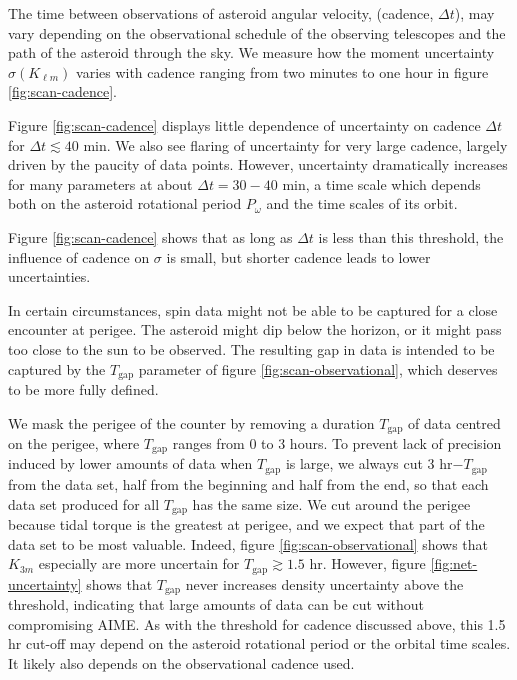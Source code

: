 \documentclass[fleqn,usenatbib]{mnras}
\begin{document}
The time between observations of asteroid angular velocity, (cadence, $\Delta t$), may vary depending on the observational schedule of the observing telescopes and the path of the asteroid through the sky.  We measure how the moment uncertainty $\sigma(K_{\ell m})$ varies with cadence ranging from two minutes to one hour in figure \ref{fig:scan-cadence}.

Figure \ref{fig:scan-cadence} displays little dependence of uncertainty on cadence $\Delta t$ for $\Delta t \lesssim 40$ min. We also see flaring of uncertainty for very large cadence, largely driven by the paucity of data points. However, uncertainty dramatically increases for many parameters at about $\Delta t = 30-40$ min, a time scale which depends both on the asteroid rotational period $P_\omega$ and the time scales of its orbit.

Figure \ref{fig:scan-cadence} shows that as long as $\Delta t$ is less than this threshold, the influence of cadence on $\sigma$ is small, but shorter cadence leads to lower uncertainties.

In certain circumstances, spin data might not be able to be captured for a close encounter at perigee. The asteroid might dip below the horizon, or it might pass too close to the sun to be observed. The resulting gap in data is intended to be captured by the $T_\text{gap}$ parameter of figure \ref{fig:scan-observational}, which deserves to be more fully defined.

We mask the perigee of the counter by removing a duration $T_\text{gap}$ of data centred on the perigee, where $T_\text{gap}$ ranges from 0 to 3 hours. To prevent lack of precision induced by lower amounts of data when $T_\text{gap}$ is large, we always cut 3 hr$-T_\text{gap}$ from the data set, half from the beginning and half from the end, so that each data set produced for all $T_\text{gap}$ has the same size. We cut around the perigee because tidal torque is the greatest at perigee, and we expect that part of the data set to be most valuable. Indeed, figure \ref{fig:scan-observational} shows that $K_{3m}$ especially are more uncertain for $T_\text{gap} \gtrsim 1.5$ hr. However, figure \ref{fig:net-uncertainty} shows that $T_\text{gap}$ never increases density uncertainty above the threshold, indicating that large amounts of data can be cut without compromising AIME. As with the threshold for cadence discussed above, this 1.5 hr cut-off may depend on the asteroid rotational period or the orbital time scales. It likely also depends on the observational cadence used.
\end{document}
